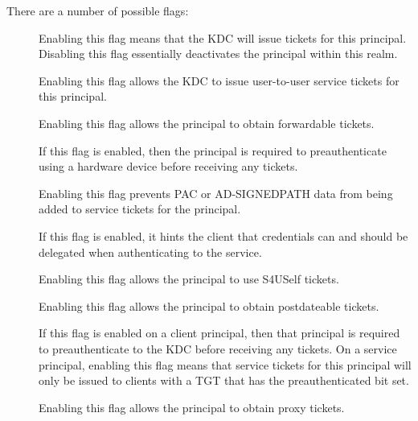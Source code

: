 \documentclass[letterpaper,10pt,english]{sphinxmanual}
\begin{document}
\begin{description}
There are a number of possible flags:
\begin{description}
\item[{}] \leavevmode
Enabling this flag means that the KDC will issue tickets for
this principal.  Disabling this flag essentially deactivates
the principal within this realm.

\item[{}] \leavevmode
Enabling this flag allows the KDC to issue user-to-user
service tickets for this principal.

\item[{}] \leavevmode
Enabling this flag allows the principal to obtain forwardable
tickets.

\item[{}] \leavevmode
If this flag is enabled, then the principal is required to
preauthenticate using a hardware device before receiving any
tickets.

\item[{}] \leavevmode
Enabling this flag prevents PAC or AD-SIGNEDPATH data from
being added to service tickets for the principal.

\item[{}] \leavevmode
If this flag is enabled, it hints the client that credentials
can and should be delegated when authenticating to the
service.

\item[{}] \leavevmode
Enabling this flag allows the principal to use S4USelf tickets.

\item[{}] \leavevmode
Enabling this flag allows the principal to obtain postdateable
tickets.

\item[{}] \leavevmode
If this flag is enabled on a client principal, then that
principal is required to preauthenticate to the KDC before
receiving any tickets.  On a service principal, enabling this
flag means that service tickets for this principal will only
be issued to clients with a TGT that has the preauthenticated
bit set.

\item[{}] \leavevmode
Enabling this flag allows the principal to obtain proxy
tickets.


\end{description}
\end{description}
\end{document}
